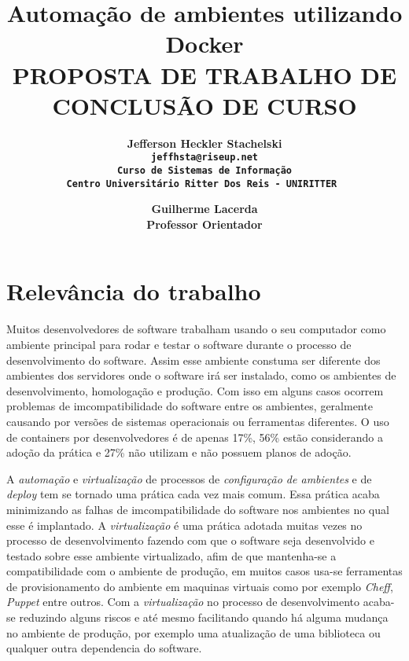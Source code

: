 \documentclass[11pt,a4paper]{article}
\begin{document}
\title{Automação de ambientes utilizando Docker\\ \smallskip
\small{PROPOSTA DE TRABALHO DE CONCLUSÃO DE CURSO}}

\author{ \bf Jefferson Heckler Stachelski\\
  \tt jeffhsta@riseup.net \\
  Curso de Sistemas de Informação \\
  Centro Universitário Ritter Dos Reis - UNIRITTER
  \and
  \bf Guilherme Lacerda\\
  Professor Orientador\\
}

\maketitle
\thispagestyle{empty}

\section{Relevância do trabalho} \label{sec:intro}

Muitos desenvolvedores de software trabalham usando o seu computador como ambiente principal para rodar e testar
o software durante o processo de desenvolvimento do software. Assim esse ambiente constuma ser diferente dos ambientes
dos servidores onde o software irá ser instalado, como os ambientes de desenvolvimento, homologação e produção.
Com isso em alguns casos ocorrem problemas de imcompatibilidade do software entre os ambientes, geralmente causando
por versões de sistemas operacionais ou ferramentas diferentes. O uso de containers por desenvolvedores é de apenas
17\%, 56\% estão considerando a adoção da prática e 27\% não utilizam e não possuem planos de adoção\cite{DZone_CD_guide_v3}.

A \textit{automação} e \textit{virtualização} de processos de \textit{configuração de ambientes} e de \textit{deploy} tem
se tornado uma prática cada vez mais comum\cite{DZone_CD_guide_v3}. Essa prática acaba minimizando as falhas de
imcompatibilidade do software nos ambientes no qual esse é implantado\cite{Fowler_continuos_integration}.
A \textit{virtualização} é uma prática adotada muitas vezes no processo de desenvolvimento fazendo com que o
software seja desenvolvido e testado sobre esse ambiente virtualizado, afim de que mantenha-se a compatibilidade
com o ambiente de produção, em muitos casos usa-se ferramentas de provisionamento do ambiente em maquinas virtuais
como por exemplo \textit{Cheff}, \textit{Puppet} entre outros\cite{Fowler_infra_as_code}. Com a \textit{virtualização}
no processo de desenvolvimento acaba-se reduzindo alguns riscos e até mesmo facilitando quando há alguma mudança
no ambiente de produção, por exemplo uma atualização de uma biblioteca ou qualquer outra dependencia do
software\cite{Fowler_continuos_integration}.
\end{document}
